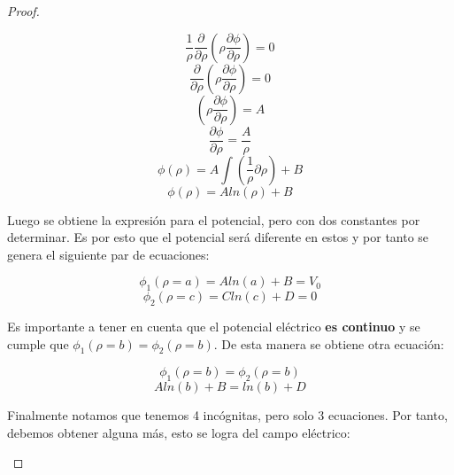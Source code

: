 \begin{proof}
\begin{enumerate}
        \begin{equation}
            \frac{1}{\rho} \frac{\partial}{\partial\rho}\left(\rho \frac{\partial \phi}{\partial \rho}\right) = 0
        \end{equation}
        \begin{equation}
            \frac{\partial}{\partial\rho}\left(\rho \frac{\partial \phi}{\partial \rho}\right) = 0
        \end{equation}
        \begin{equation}
             \left(\rho \frac{\partial \phi}{\partial \rho}\right) = A
        \end{equation}
        \begin{equation}
             \frac{\partial \phi}{\partial \rho} = \frac{A}{\rho}
        \end{equation}
        \begin{equation}
             \phi(\rho) = A\int\left(\frac{1}{\rho}\partial\rho\right) + B
        \end{equation}
        \begin{equation}
              \phi(\rho) = Aln(\rho) + B
        \end{equation}
        
        Luego se obtiene la expresión para el potencial, pero con dos constantes por determinar. Es por esto que el potencial será diferente en estos y por tanto se genera el siguiente par de ecuaciones:
        
        \begin{equation}
            \phi_{1}(\rho=a) = Aln(a) + B = V_{0}
        \end{equation}
        \begin{equation}
            \phi_{2}(\rho=c) = Cln(c) + D = 0
        \end{equation}
        
        Es importante a tener en cuenta que el potencial eléctrico \textbf{es continuo} y se cumple que $\phi_{1}(\rho=b) =\phi_{2}(\rho=b) $. De esta manera se obtiene otra ecuación:
        
        \begin{equation}
            \phi_{1}(\rho=b) = \phi_{2}(\rho=b)
        \end{equation}
        \begin{equation}
            Aln(b) + B = ln(b) + D 
        \end{equation}
        
        Finalmente notamos que tenemos 4 incógnitas, pero solo 3 ecuaciones. Por tanto, debemos obtener alguna más, esto se logra del campo eléctrico:
        

\end{enumerate}
\end{proof}

